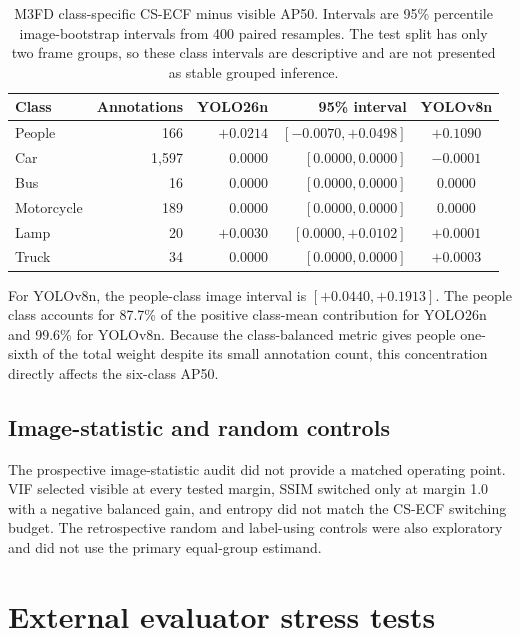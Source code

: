 \documentclass[11pt]{article}
\begin{document}
\begin{table}[h]
\centering
\small
\caption{M3FD class-specific CS-ECF minus visible AP50. Intervals are 95\%
percentile image-bootstrap intervals from 400 paired resamples. The test split
has only two frame groups, so these class intervals are descriptive and are
not presented as stable grouped inference.}
\label{tab:m3fd-classes-detail}
\begin{tabular}{@{}lrrrc@{}}
\toprule
Class & Annotations & YOLO26n & 95\% interval & YOLOv8n \\
\midrule
People & 166 & \(+0.0214\) & \([-0.0070,+0.0498]\) & \(+0.1090\) \\
Car & 1,597 & \(0.0000\) & \([0.0000,0.0000]\) & \(-0.0001\) \\
Bus & 16 & \(0.0000\) & \([0.0000,0.0000]\) & \(0.0000\) \\
Motorcycle & 189 & \(0.0000\) & \([0.0000,0.0000]\) & \(0.0000\) \\
Lamp & 20 & \(+0.0030\) & \([0.0000,+0.0102]\) & \(+0.0001\) \\
Truck & 34 & \(0.0000\) & \([0.0000,0.0000]\) & \(+0.0003\) \\
\bottomrule
\end{tabular}
\end{table}

For YOLOv8n, the people-class image interval is
\([+0.0440,+0.1913]\). The people class accounts for 87.7\% of the positive
class-mean contribution for YOLO26n and 99.6\% for YOLOv8n. Because the
class-balanced metric gives people one-sixth of the total weight despite its
small annotation count, this concentration directly affects the six-class AP50.

\subsection{Image-statistic and random controls}

The prospective image-statistic audit did not provide a matched operating
point. VIF selected visible at every tested margin, SSIM switched only at
margin 1.0 with a negative balanced gain, and entropy did not match the CS-ECF
switching budget. The retrospective random and label-using controls were also
exploratory and did not use the primary equal-group estimand.

\section{External evaluator stress tests}
\end{document}
